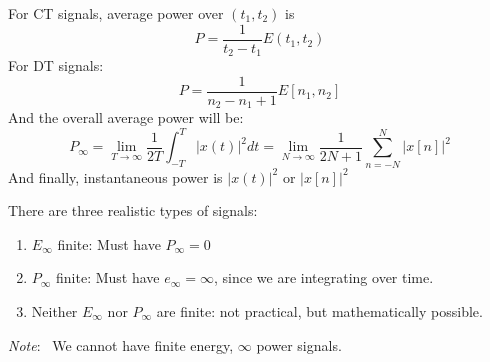 \documentclass[nobib]{tufte-handout}
\newcommand{\note}[1]{
        \begin{notebox}
        \noindent\textit{Note}:\ #1
        \end{notebox}
}
\begin{document}
\begin{enumerate}
\begin{itemize}
                    For CT signals, average power over $(t_1,t_2)$ is \begin{equation*}
                        P = \frac{1}{t_2-t_1}E(t_1,t_2)
                    \end{equation*}
                    For DT signals:
                    \begin{equation*}
                        P = \frac{1}{n_2-n_1+1}E[n_1,n_2]
                    \end{equation*}
                    And the overall average power will be:\begin{equation*}
                        P_\infty = \lim_{T\rightarrow\infty}\frac{1}{2T}\int_{-T}^{T}|x(t)|^2 dt = \lim_{N\rightarrow\infty}\frac{1}{2N+1}\sum_{n=-N}^{N}|x[n]|^2
                    \end{equation*}
                    And finally, instantaneous power is $|x(t)|^2$ or $|x[n]|^2$
          \end{itemize}
          There are three realistic types of signals:\begin{enumerate}
            \item $E_\infty$ finite: Must have $P_\infty =0$
            \item $P_\infty$ finite: Must have $e_\infty = \infty$, since we are integrating over time.
            \item Neither $E_\infty$ nor $P_\infty$ are finite: not practical, but mathematically possible.
          \end{enumerate}
          \note{ We cannot have finite energy, $\infty$ power signals.}
          
\end{enumerate}
\end{document}
